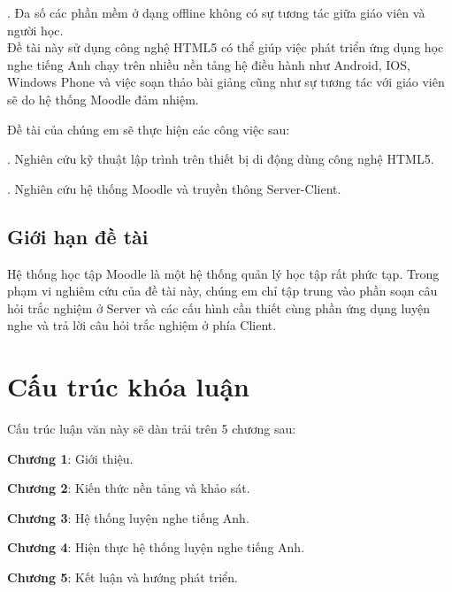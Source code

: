 	. Đa số các phần mềm ở dạng offline không có sự tương tác giữa giáo viên và người học.\\
	
	Đề tài này sử dụng công nghệ HTML5 có thể giúp việc phát triển ứng dụng học nghe tiếng Anh chạy trên nhiều nền tảng hệ điều hành như Android, IOS, Windows Phone và việc soạn thảo bài giảng cũng như sự tương tác với giáo viên sẽ do hệ thống Moodle đảm nhiệm.
	
	Đề tài của chúng em sẽ thực hiện các công việc sau:
	
	. Nghiên cứu kỹ thuật lập trình trên thiết bị di động dùng công nghệ HTML5.
	
	. Nghiên cứu hệ thống Moodle và truyền thông Server-Client.
	

\subsection{Giới hạn đề tài}

	Hệ thống học tập Moodle là một hệ thống quản lý học tập rất phức tạp. Trong phạm vi nghiêm cứu của đề tài này, chúng em chỉ tập trung vào phần soạn câu hỏi trắc nghiệm ở Server và các cấu hình cần thiết cùng phần ứng dụng luyện nghe và trả lời câu hỏi trắc nghiệm ở phía Client.

\section{Cấu trúc khóa luận}

	Cấu trúc luận văn này sẽ dàn trải trên 5 chương sau:
	
	\textbf{Chương 1}: Giới thiệu.
	
	\textbf{Chương 2}: Kiến thức nền tảng và khảo sát.
	
	\textbf{Chương 3}: Hệ thống luyện nghe tiếng Anh.
	
	\textbf{Chương 4}: Hiện thực hệ thống luyện nghe tiếng Anh.
	
	\textbf{Chương 5}: Kết luận và hướng phát triển.
